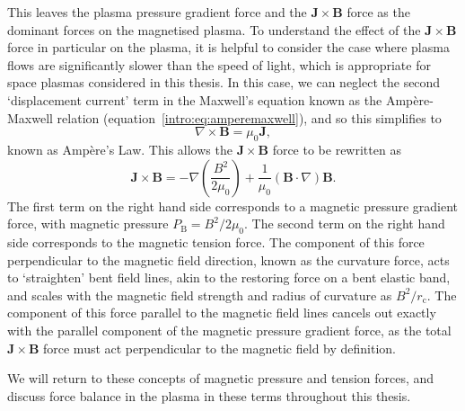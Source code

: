 This leaves the plasma pressure gradient force and the $\boldsymbol{J}\times\boldsymbol{B}$ force as the dominant forces on the magnetised plasma. To understand the effect of the $\boldsymbol{J}\times\boldsymbol{B}$ force in particular on the plasma, it is helpful to consider the case where plasma flows are significantly slower than the speed of light, which is appropriate for space plasmas considered in this thesis. In this case, we can neglect the second `displacement current' term in the Maxwell's equation known as the Amp\`ere-Maxwell relation (equation~\ref{intro:eq:amperemaxwell}), and so this simplifies to 
\begin{equation}\label{intro:eq:ampere}
\nabla \times \boldsymbol{B} = \mu_0 \boldsymbol{J}, 
\end{equation}
known as Amp\`ere's Law. This allows the $\boldsymbol{J}\times\boldsymbol{B}$ force to be rewritten as
\begin{equation}\label{intro:eq:bpressuretension}
\boldsymbol{J}\times\boldsymbol{B} = -\nabla\left(\frac{B^2}{2\mu_0}\right)+\frac{1}{\mu_0}(\boldsymbol{B}\cdot\nabla)\boldsymbol{B}.
\end{equation}
The first term on the right hand side corresponds to a magnetic pressure gradient force, with magnetic pressure $P_\mathrm{B} = B^2/2\mu_0$. The second term on the right hand side corresponds to the magnetic tension force. The component of this force perpendicular to the magnetic field direction, known as the curvature force, acts to `straighten' bent field lines, akin to the restoring force on a bent elastic band, and scales with the magnetic field strength and radius of curvature as $B^2/r_\mathrm{c}$. The component of this force parallel to the magnetic field lines cancels out exactly with the parallel component of the magnetic pressure gradient force, as the total $\boldsymbol{J}\times\boldsymbol{B}$ force must act perpendicular to the magnetic field by definition.

We will return to these concepts of magnetic pressure and tension forces, and discuss force balance in the plasma in these terms throughout this thesis.

